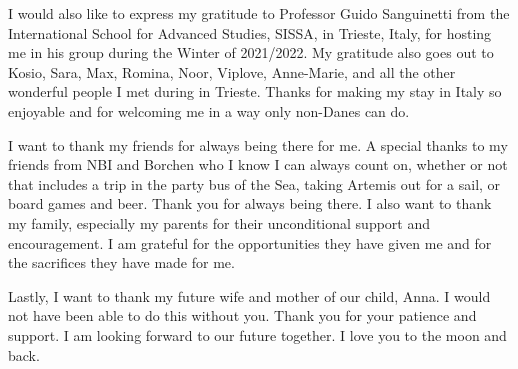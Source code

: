 I would also like to express my gratitude to Professor Guido Sanguinetti from the International School for Advanced Studies, SISSA, in Trieste, Italy, for hosting me in his group during the Winter of 2021/2022. My gratitude also goes out to Kosio, Sara, Max, Romina, Noor, Viplove, Anne-Marie, and all the other wonderful people I met during in Trieste. Thanks for making my stay in Italy so enjoyable and for welcoming me in a way only non-Danes can do.

I want to thank my friends for always being there for me. A special thanks to my friends from NBI and Borchen who I know I can always count on, whether or not that includes a trip in the party bus of the Sea, taking Artemis out for a sail, or board games and beer. Thank you for always being there. I also want to thank my family, especially my parents for their unconditional support and encouragement. I am grateful for the opportunities they have given me and for the sacrifices they have made for me.

Lastly, I want to thank my future wife and mother of our child, Anna. I would not have been able to do this without you. Thank you for your patience and support. I am looking forward to our future together. I love you to the moon and back.